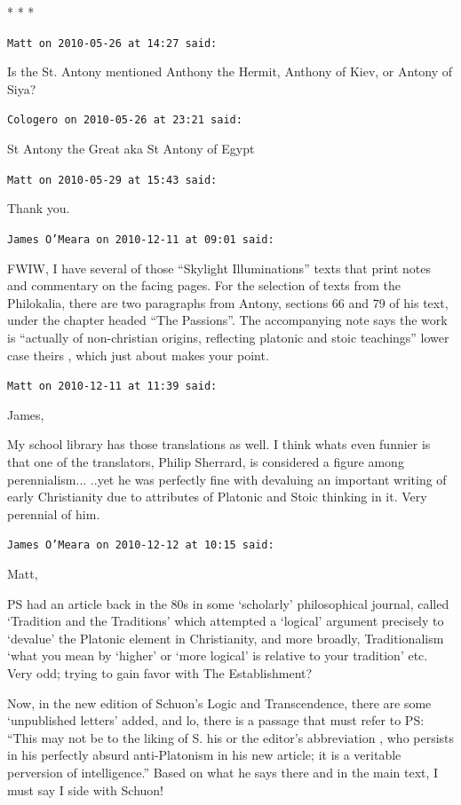 
\begin{center}* * *\end{center}

\begin{footnotesize}
\begin{sffamily}
\texttt{Matt on 2010-05-26 at 14:27 said:}

Is the St. Antony mentioned Anthony the Hermit, Anthony of Kiev, or Antony of Siya?

\hfill

\texttt{Cologero on 2010-05-26 at 23:21 said:}

St Antony the Great aka St Antony of Egypt

\hfill

\texttt{Matt on 2010-05-29 at 15:43 said:}

Thank you.

\hfill

\texttt{James O'Meara on 2010-12-11 at 09:01 said:}

FWIW, I have several of those ``Skylight Illuminations'' texts that print notes and commentary on the facing pages. For the selection of texts from the Philokalia, there are two paragraphs from Antony, sections 66 and 79 of his text, under the chapter headed ``The Passions''. The accompanying note says the work is ``actually of non-christian origins, reflecting platonic and stoic teachings'' lower case theirs , which just about makes your point.

\hfill

\texttt{Matt on 2010-12-11 at 11:39 said:}

James,

My school library has those translations as well. I think whats even funnier is that one of the translators, Philip Sherrard, is considered a figure among perennialism... ..yet he was perfectly fine with devaluing an important writing of early Christianity due to attributes of Platonic and Stoic thinking in it. Very perennial of him.

\hfill

\texttt{James O'Meara on 2010-12-12 at 10:15 said:}

Matt,

PS had an article back in the 80s in some `scholarly' philosophical journal, called `Tradition and the Traditions' which attempted a `logical' argument precisely to `devalue' the Platonic element in Christianity, and more broadly, Traditionalism `what you mean by `higher' or `more logical' is relative to your tradition' etc. Very odd; trying to gain favor with The Establishment?

Now, in the new edition of Schuon's Logic and Transcendence, there are some `unpublished letters' added, and lo, there is a passage that must refer to PS: ``This may not be to the liking of S. his or the editor's abbreviation , who persists in his perfectly absurd anti-Platonism in his new article; it is a veritable perversion of intelligence.'' Based on what he says there and in the main text, I must say I side with Schuon!

\end{sffamily}
\end{footnotesize}

